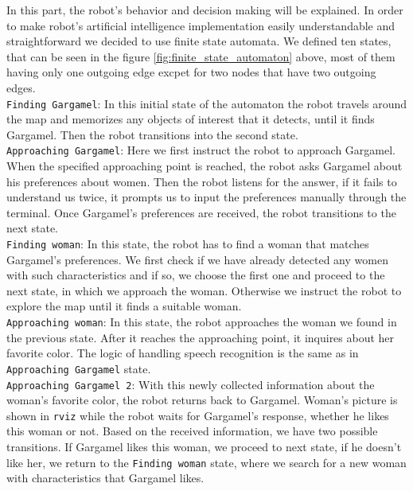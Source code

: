 \documentclass[12pt,a4paper]{article}
\begin{document}
	In this part, the robot's behavior and decision making will be explained. In order to make robot's artificial intelligence implementation easily understandable and straightforward we decided to use finite state automata. We defined ten states, that can be seen in the figure \ref{fig:finite_state_automaton} above, most of them having only one outgoing edge excpet for two nodes that have two outgoing edges. \\

	\texttt{Finding Gargamel}: In this initial state of the automaton the robot travels around the map and memorizes any objects of interest that it detects, until it finds Gargamel. Then the robot transitions into the second state. \\

	\texttt{Approaching Gargamel}: Here we first instruct the robot to approach Gargamel. When the specified approaching point is reached, the robot asks Gargamel about his preferences about women. Then the robot listens for the answer, if it fails to understand us twice, it prompts us to input the preferences manually through the terminal. Once Gargamel's preferences are received, the robot transitions to the next state. \\

	\texttt{Finding woman}: In this state, the robot has to find a woman that matches Gargamel's preferences. We first check if we have already detected any women with such characteristics and if so, we choose the first one and proceed to the next state, in which we approach the woman. Otherwise we instruct the robot to explore the map until it finds a suitable woman. \\

	\texttt{Approaching woman}: In this state, the robot approaches the woman we found in the previous state. After it reaches the approaching point, it inquires about her favorite color. The logic of handling speech recognition is the same as in \texttt{Approaching Gargamel} state. \\

	\texttt{Approaching Gargamel 2}: With this newly collected information about the woman's favorite color, the robot returns back to Gargamel. Woman's picture is shown in \texttt{rviz} while the robot waits for Gargamel's response, whether he likes this woman or not. Based on the received information, we have two possible transitions. If Gargamel likes this woman, we proceed to next state, if he doesn't like her, we return to the \texttt{Finding woman} state, where we search for a new woman with characteristics that Gargamel likes. \\
\end{document}
